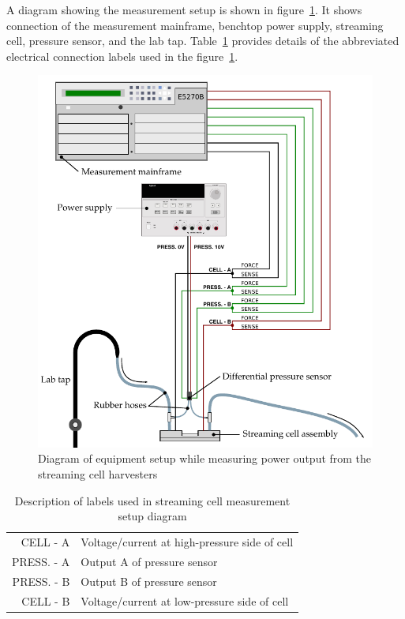     A diagram showing the measurement setup is shown in figure~\ref{fig:measurementSetup}.
    It shows connection of the measurement mainframe, benchtop power supply, streaming cell, pressure sensor, and the lab tap.
    Table~\ref{tab:measurementSetup_legend} provides details of the abbreviated electrical connection labels used in the figure~\ref{fig:measurementSetup}.

    \begin{figure}
        \includegraphics{content/pt1/01-PowerHarvesting/graphics/measurementSetup}
        \caption{\label{fig:measurementSetup}Diagram of equipment setup while measuring power output from the streaming cell harvesters}
    \end{figure}

    \begin{table}
        \centering
        \begin{tabular}{r|l}
        CELL - A & Voltage/current at high-pressure side of cell\\
        PRESS. - A & Output A of pressure sensor\\
        PRESS. - B & Output B of pressure sensor\\
        CELL - B & Voltage/current at low-pressure side of cell
        \end{tabular}
        \caption{\label{tab:measurementSetup_legend}Description of labels used in streaming cell measurement setup diagram}
    \end{table}

